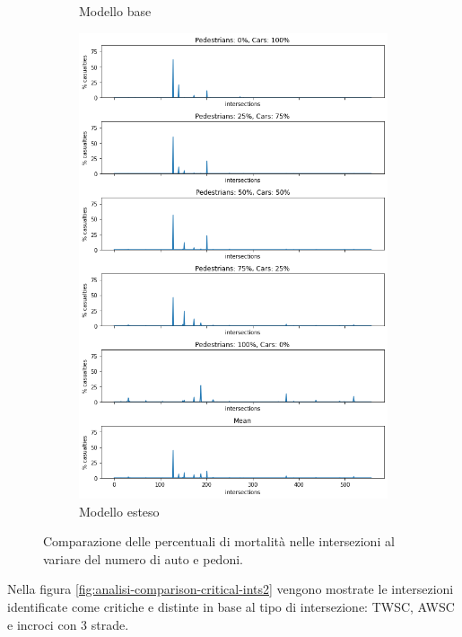 \begin{figure}[ht]
\begin{subfigure}{0.45\textwidth}
        \caption{Modello base}
        \label{fig:base-ints-casualties}
    \end{subfigure}
    \hfill
    \begin{subfigure}{0.45\textwidth}
        \centering
        \includegraphics[width=\textwidth]{images/analisi/comparison-critical-ints-new.png}
        \caption{Modello esteso}
        \label{fig:new-ints-casualties}
    \end{subfigure}
    \caption{Comparazione delle percentuali di mortalità nelle intersezioni al variare del numero di auto e pedoni.}
    \label{fig:analisi-comparison-critical-ints1}
\end{figure}

\pagebreak

Nella figura \ref{fig:analisi-comparison-critical-ints2} vengono mostrate le intersezioni identificate 
come critiche e distinte in base al tipo di intersezione: TWSC, AWSC e incroci con 3 strade.

